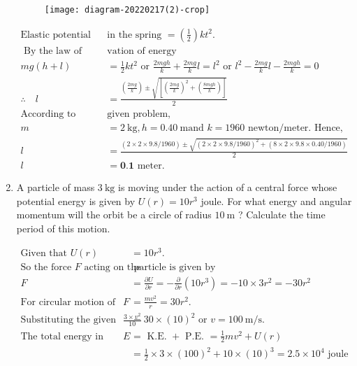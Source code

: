 \begin{enumerate}
\begin{answer}
	\begin{figure}[H]
		\centering
		\texttt{[image: diagram-20220217(2)-crop]}
	\end{figure}
	\begin{align*}
	\text{Elastic potential energy }&\text{in the spring }=\left(\frac{1}{2}\right) k t^{2}.\\
\text{	By the law of conser}&\text{vation of energy}\\
	m g(h+l)&=\frac{1}{2} k t^{2} \text { or } \frac{2 m g h}{k}+\frac{2 m g}{k} l=l^{2} \text { or } l^{2}-\frac{2 m g}{k} l-\frac{2 m g h}{k}=0\\
	\therefore \quad l&=\frac{\left(\frac{2 m g}{k}\right) \pm \sqrt{\left[\left(\frac{2 m g}{k}\right)^{2}+\left(\frac{8 m g h}{k}\right)\right]}}{2}\\
	\text{According to  }&\text{given problem, }\\
	m&=2 \mathrm{~kg}, h=0.40 \mathrm{~m} \text{and $k=1960$ newton/meter. Hence,}\\
	l&=\frac{(2 \times 2 \times 9.8 / 1960) \pm \sqrt{(2 \times 2 \times 9.8 / 1960)^{2}+(8 \times 2 \times 9.8 \times 0.40 / 1960)}}{2} \\
	l&=\mathbf{0 . 1} \text { meter. }
	\end{align*}
\end{answer}
\item A particle of mass $3 \mathrm{~kg}$ is moving under the action of a central force whose potential energy is given by $U(r)=10 r^{3}$ joule. For what energy and angular momentum will the orbit be a circle of radius $10 \mathrm{~m}$ ? Calculate the time period of this motion.
\begin{answer}
	\begin{align*}
	\text{Given that }U(r)&=10 r^{3}.\\
	\text{So the force $F$ acting on the}&\text{ particle is given by}\\
	F&=\frac{\partial U}{\partial r}=-\frac{\partial}{\partial r}\left(10 r^{3}\right)=-10 \times 3 r^{2}=-30 r^{2}\\
	\text{For circular motion of the particle }F&=\frac{m v^{2}}{r}=30 r^{2}.\\
	\text{Substituting the given values, we have }\frac{3 \times v^{2}}{10}&=30 \times(10)^{2}\text{ or }v=100 \mathrm{~m} / \mathrm{s}.\\
	\text{The total energy in circular motion}
	E&=\text{ K.E. }+\text{ P.E. }=\frac{1}{2} m v^{2}+U(r)\\&=\frac{1}{2} \times 3 \times(100)^{2}+10 \times(10)^{3}=2.5 \times 10^{4}\text{ joule}\\

\end{align*}
\end{answer}
\end{enumerate}
